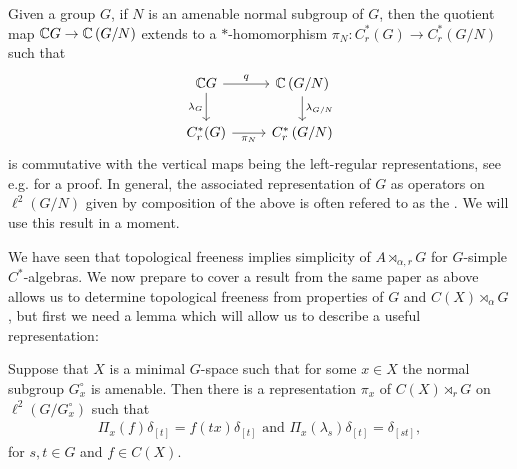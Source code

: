 \begin{remark}
	Given a group $G$, if $N$ is an amenable normal subgroup of $G$, then the quotient map $\mathbb{C} G \to \mathbb{C} \left(G/N\right)$ extends to a $*$-homomorphism $\pi_N \colon C_r^*(G) \to C_r^*\left( G/N \right)$ such that
\begin{equation}
	\begin{tikzcd}
		\C G \ar[r,"q"] \ar[d,"\lambda_G"'] & \C\left( G/N \right) \ar[d, "\lambda_{G/N}"]\\
		C_r^*(G) \ar[r,"\pi_N"'] & C_r^*\left( G/N \right)
	\end{tikzcd}
\end{equation}
is commutative with the vertical maps being the left-regular representations, see e.g. \cite[Proposition 3]{de2007simplicity} for a proof. In general, the associated representation of $G$ as operators on $\ell^2(G/N)$ given by composition of the above is often refered to as the . We will use this result in a moment.
\end{remark}
We have seen that topological freeness implies simplicity of $A \rtimes_{\alpha,r} G$ for $G$-simple $C^*$-algebras. We now prepare to cover a result from the same paper as above allows us to determine topological freeness from properties of $G$ and $C(X)\rtimes_\alpha G$, but first we need a lemma which will allow us to describe a useful representation:
\begin{lemma}
	Suppose that $X$ is a minimal $G$-space such that for some $x \in X$ the normal subgroup $G_x^\circ$ is amenable. Then there is a representation $\pi_x$ of $C(X) \rtimes_r G$ on $\ell^2(G/G_x^\circ)$ such that
	\begin{align*}
		\Pi_x(f)\delta_{[t]} = f(tx)\delta_{[t]} \text{  and  } \Pi_x(\lambda_s)\delta_{[t]} = \delta_{[st]},
	\end{align*}
	for $s,t \in G$ and $f \in C(X)$.
	\label{CXGrep}
\end{lemma}
